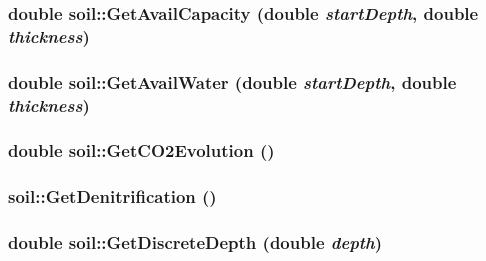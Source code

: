 \label{classsoil_a4ed6d8238db0cde0c7ceb073ec61fe83}
\hypertarget{classsoil_ab8f4f06f1f806065b589815bedd8d5b9}{
\subsubsection[{GetAvailCapacity}]{\setlength{\rightskip}{0pt plus 5cm}double soil::GetAvailCapacity (double {\em startDepth}, \/  double {\em thickness})}}
\label{classsoil_ab8f4f06f1f806065b589815bedd8d5b9}
\hypertarget{classsoil_a42157cb55748341f87032731541d5f4f}{
\subsubsection[{GetAvailWater}]{\setlength{\rightskip}{0pt plus 5cm}double soil::GetAvailWater (double {\em startDepth}, \/  double {\em thickness})}}
\label{classsoil_a42157cb55748341f87032731541d5f4f}
\hypertarget{classsoil_a8a7cf5f2dd1ac2b9fa3b99f25e91d187}{
\subsubsection[{GetCO2Evolution}]{\setlength{\rightskip}{0pt plus 5cm}double soil::GetCO2Evolution ()}}
\label{classsoil_a8a7cf5f2dd1ac2b9fa3b99f25e91d187}
\hypertarget{classsoil_ac7be4d148fee7795d9a5202ed0988e86}{
\subsubsection[{GetDenitrification}]{ soil::GetDenitrification ()}}
\label{classsoil_ac7be4d148fee7795d9a5202ed0988e86}
\hypertarget{classsoil_a4b5fc63de9d8e884671531a728275a88}{
\subsubsection[{GetDiscreteDepth}]{\setlength{\rightskip}{0pt plus 5cm}double soil::GetDiscreteDepth (double {\em depth})}}
